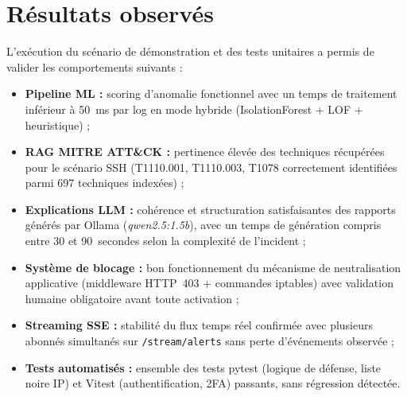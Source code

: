 \documentclass[12pt,a4paper]{report}
\begin{document}
\section{Résultats observés}
\begin{onehalfspace}
L'exécution du scénario de démonstration et des tests unitaires a permis
de valider les comportements suivants :
\begin{itemize}
  \item[\ding{43}] \textbf{Pipeline ML :} scoring d'anomalie fonctionnel avec un
  temps de traitement inférieur à 50~ms par log en mode hybride
  (IsolationForest + LOF + heuristique) ;
  \item[\ding{43}] \textbf{RAG MITRE ATT\&CK :} pertinence élevée des techniques
  récupérées pour le scénario SSH (T1110.001, T1110.003, T1078 correctement
  identifiées parmi 697 techniques indexées) ;
  \item[\ding{43}] \textbf{Explications LLM :} cohérence et structuration
  satisfaisantes des rapports générés par Ollama (\textit{qwen2.5:1.5b}),
  avec un temps de génération compris entre 30 et 90~secondes selon
  la complexité de l'incident ;
  \item[\ding{43}] \textbf{Système de blocage :} bon fonctionnement du mécanisme
  de neutralisation applicative (middleware HTTP~403 + commandes iptables)
  avec validation humaine obligatoire avant toute activation ;
  \item[\ding{43}] \textbf{Streaming SSE :} stabilité du flux temps réel
  confirmée avec plusieurs abonnés simultanés sur \texttt{/stream/alerts}
  sans perte d'événements observée ;
  \item[\ding{43}] \textbf{Tests automatisés :} ensemble des tests pytest
  (logique de défense, liste noire IP) et Vitest (authentification, 2FA)
  passants, sans régression détectée.
\end{itemize}
\end{onehalfspace}
\end{document}
